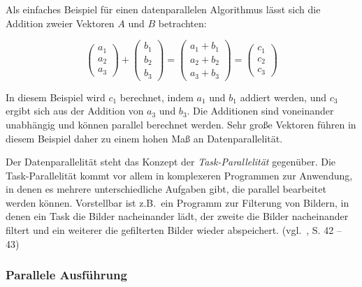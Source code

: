 Als einfaches Beispiel für einen datenparallelen Algorithmus lässt sich die Addition zweier Vektoren $A$ und $B$
betrachten:

\begin{equation*}
    \left(
        \begin{array}{c}
            a_1\\
            a_2\\
            a_3
        \end{array}
    \right)
    +
    \left(
        \begin{array}{c}
            b_1\\
            b_2\\
            b_3
        \end{array}
    \right)
    =
    \left(
        \begin{array}{c}
            a_1 + b_1 \\
            a_2 + b_2 \\
            a_3 + b_3
        \end{array}
    \right)
    =
    \left(
        \begin{array}{c}
            c_1 \\
            c_2 \\
            c_3
        \end{array}
    \right)
\end{equation*}

In diesem Beispiel wird $c_1$ berechnet, indem $a_1$ und $b_1$ addiert werden, und $c_3$ ergibt sich aus der Addition
von $a_3$ und $b_3$. Die Additionen sind voneinander unabhängig und können parallel berechnet werden. Sehr große
Vektoren führen in diesem Beispiel daher zu einem hohen Maß an Datenparallelität.

Der Datenparallelität steht das Konzept der \textit{Task-Parallelität} gegenüber. Die Task-Parallelität kommt vor allem
in komplexeren Programmen zur Anwendung, in denen es mehrere unterschiedliche Aufgaben gibt, die parallel bearbeitet
werden können. Vorstellbar ist z.B.\ ein Programm zur Filterung von Bildern, in denen ein Task die Bilder nacheinander
lädt, der zweite die Bilder nacheinander filtert und ein weiterer die gefilterten Bilder wieder abspeichert.
(vgl.~\cite{kirkhwu}, S. 42 -- 43)

\subsubsection*{Parallele Ausführung}

